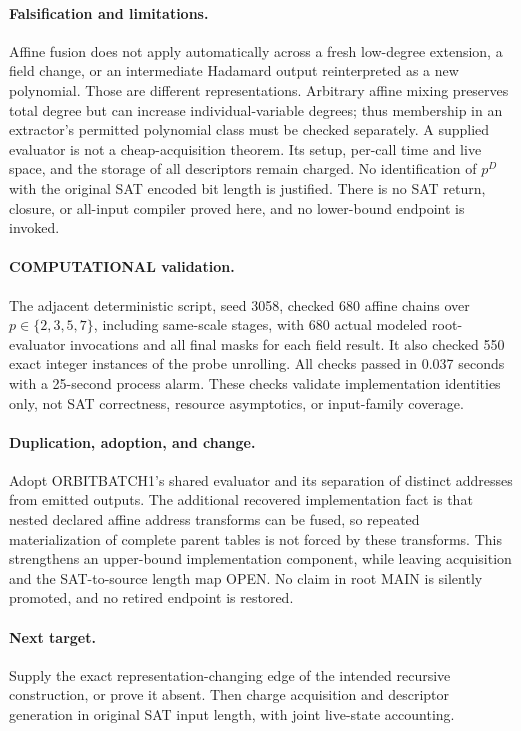 \documentclass[11pt]{article}
\begin{document}
\paragraph{Falsification and limitations.}
Affine fusion does not apply automatically across a fresh low-degree
extension, a field change, or an intermediate Hadamard output reinterpreted
as a new polynomial. Those are different representations. Arbitrary affine
mixing preserves total degree but can increase individual-variable degrees;
thus membership in an extractor's permitted polynomial class must be
checked separately. A supplied evaluator is not a cheap-acquisition theorem.
Its setup, per-call time and live space, and the storage of all descriptors
remain charged. No identification of $p^D$ with the original SAT encoded
bit length is justified. There is no SAT return, closure, or all-input
compiler proved here, and no lower-bound endpoint is invoked.

\paragraph{COMPUTATIONAL validation.}
The adjacent deterministic script, seed 3058, checked 680 affine chains over
$p\in\{2,3,5,7\}$, including same-scale stages, with 680 actual modeled
root-evaluator invocations and all final masks for each field result.
It also checked 550 exact integer instances of the probe unrolling.
All checks passed in 0.037 seconds with a 25-second process alarm.
These checks validate implementation identities only, not SAT correctness,
resource asymptotics, or input-family coverage.

\paragraph{Duplication, adoption, and change.}
Adopt ORBITBATCH1's shared evaluator and its separation of distinct addresses
from emitted outputs. The additional recovered implementation fact is that
nested declared affine address transforms can be fused, so repeated
materialization of complete parent tables is not forced by these transforms.
This strengthens an upper-bound implementation component, while leaving
acquisition and the SAT-to-source length map OPEN. No claim in root MAIN is
silently promoted, and no retired endpoint is restored.

\paragraph{Next target.}
Supply the exact representation-changing edge of the intended recursive
construction, or prove it absent. Then charge acquisition and descriptor
generation in original SAT input length, with joint live-state accounting.
\end{document}
